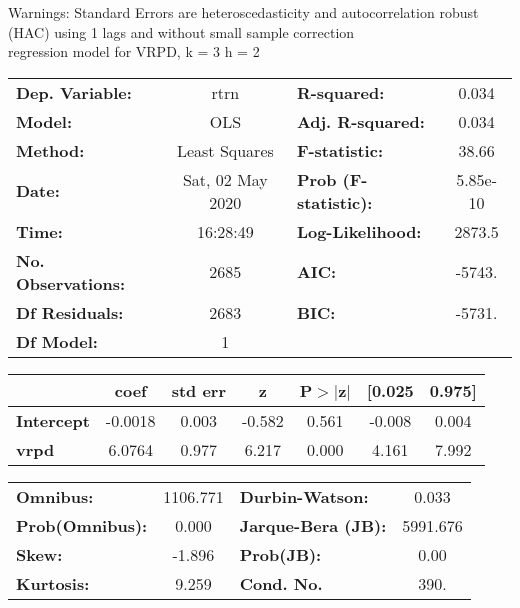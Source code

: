 Warnings: \newline
 [1] Standard Errors are heteroscedasticity and autocorrelation robust (HAC) using 1 lags and without small sample correction\\ 

regression model for VRPD, k = 3 h = 2\begin{center}
\begin{tabular}{lclc}
\toprule
\textbf{Dep. Variable:}    &       rtrn       & \textbf{  R-squared:         } &     0.034   \\
\textbf{Model:}            &       OLS        & \textbf{  Adj. R-squared:    } &     0.034   \\
\textbf{Method:}           &  Least Squares   & \textbf{  F-statistic:       } &     38.66   \\
\textbf{Date:}             & Sat, 02 May 2020 & \textbf{  Prob (F-statistic):} &  5.85e-10   \\
\textbf{Time:}             &     16:28:49     & \textbf{  Log-Likelihood:    } &    2873.5   \\
\textbf{No. Observations:} &        2685      & \textbf{  AIC:               } &    -5743.   \\
\textbf{Df Residuals:}     &        2683      & \textbf{  BIC:               } &    -5731.   \\
\textbf{Df Model:}         &           1      & \textbf{                     } &             \\
\bottomrule
\end{tabular}
\begin{tabular}{lcccccc}
                   & \textbf{coef} & \textbf{std err} & \textbf{z} & \textbf{P$> |$z$|$} & \textbf{[0.025} & \textbf{0.975]}  \\
\midrule
\textbf{Intercept} &      -0.0018  &        0.003     &    -0.582  &         0.561        &       -0.008    &        0.004     \\
\textbf{vrpd}      &       6.0764  &        0.977     &     6.217  &         0.000        &        4.161    &        7.992     \\
\bottomrule
\end{tabular}
\begin{tabular}{lclc}
\textbf{Omnibus:}       & 1106.771 & \textbf{  Durbin-Watson:     } &    0.033  \\
\textbf{Prob(Omnibus):} &   0.000  & \textbf{  Jarque-Bera (JB):  } & 5991.676  \\
\textbf{Skew:}          &  -1.896  & \textbf{  Prob(JB):          } &     0.00  \\
\textbf{Kurtosis:}      &   9.259  & \textbf{  Cond. No.          } &     390.  \\
\bottomrule
\end{tabular}
\end{center}

